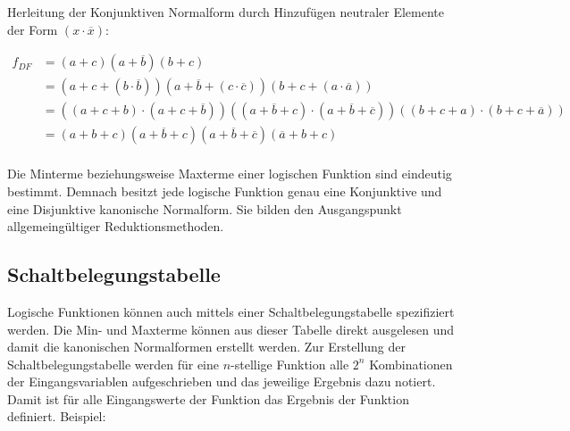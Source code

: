 Herleitung der Konjunktiven Normalform durch Hinzufügen neutraler Elemente der Form $(x \cdot \overline{x})$:

\begin{align*}
	f_{\textit{DF}} &= (a + c) (a + \overline{b}) (b + c) \\
					&= (a + c + (b \cdot \overline{b})) 
						(a + \overline{b} + (c \cdot \overline{c})) 
						(b + c + (a \cdot \overline{a})) \\
					&= ((a + c + b) \cdot (a + c + \overline{b})) 
						((a + \overline{b} + c) \cdot 
						(a + \overline{b} + \overline{c}))
						((b + c + a) \cdot (b + c + \overline{a})) \\
					&= (a + b + c) (a + \overline{b} + c)
						(a + \overline{b} + \overline{c})
						(\overline{a} + b + c) \\
\end{align*}

Die Minterme beziehungsweise Maxterme einer logischen Funktion sind eindeutig bestimmt. Demnach besitzt jede logische Funktion genau eine Konjunktive und eine Disjunktive kanonische Normalform. Sie bilden den Ausgangspunkt allgemeingültiger Reduktionsmethoden.

\subsection{Schaltbelegungstabelle}
Logische Funktionen können auch mittels einer Schaltbelegungstabelle spezifiziert werden. Die Min- und Maxterme können aus dieser Tabelle direkt ausgelesen und damit die kanonischen Normalformen erstellt werden. Zur Erstellung der Schaltbelegungstabelle werden für eine $n$-stellige Funktion alle $2^n$ Kombinationen der Eingangsvariablen aufgeschrieben und das jeweilige Ergebnis dazu notiert. Damit ist für alle Eingangswerte der Funktion das Ergebnis der Funktion definiert. Beispiel:

